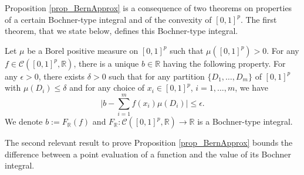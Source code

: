 \documentclass[anon,12pt]{colt2021} %
\begin{document}
Proposition \ref{prop_BernApprox} is a consequence of two theorems on properties of a certain Bochner-type integral and of the convexity of $[0,1]^{p}$. The first theorem, that we state below, defines this Bochner-type integral.

\begin{theorem}\citep[Theorem 6.2.1]{ApproxTheory} \label{theorem_BochInt}
Let $\mu$ be a Borel positive measure on $[0,1]^{p}$ such that $\mu([0,1]^{p})>0$. For any $f \in \mathcal{C}([0,1]^{p}, \mathbb{R})$, there is a unique $b \in \mathbb{R}$ having the following property. For any $\epsilon > 0$, there exists $\delta > 0$ such that for any partition $\{D_{1}, \dots, D_{m} \}$ of $[0,1]^{p}$ with $\mu(D_{i}) \leq \delta$ and for any choice of $x_{i} \in [0,1]^{p}$, $i=1, \dots, m$, we have
\begin{equation*}
    \big \vert b - \sum_{i=1}^{m} f(x_{i})\mu(D_{i}) \big \vert \leq \epsilon.
\end{equation*}
We denote $b:=F_{\mathbb{R}}(f)$ and $F_{\mathbb{R}}: \mathcal{C}([0,1]^{p}, \mathbb{R}) \rightarrow \mathbb{R}$ is a Bochner-type integral.
\end{theorem}

The second relevant result to prove Proposition \ref{prop_BernApprox} bounds the difference between a point evaluation of a function and the value of its Bochner integral.
\end{document}
